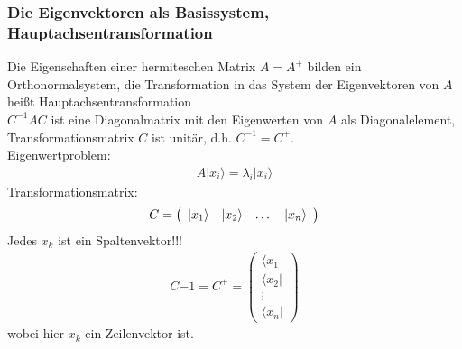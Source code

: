 \documentclass{article}
\begin{document}
\subsubsection{Die Eigenvektoren als Basissystem, Hauptachsentransformation}
Die Eigenschaften einer hermiteschen Matrix $A = A^+$ bilden ein Orthonormalsystem, die Transformation in das System der Eigenvektoren von $A$ heißt Hauptachsentransformation\\
$C^{-1}AC$ ist eine Diagonalmatrix mit den Eigenwerten von $A$ als Diagonalelement, Transformationsmatrix $C$ ist unitär, d.h. $C^{-1} = C^+$.\\
Eigenwertproblem:\begin{eqnarray*}
    A|x_i\rangle = \lambda_i|x_i\rangle
\end{eqnarray*}
Transformationsmatrix:\begin{eqnarray*}
    C=\left(\begin{array}{c c c c}
        |x_1\rangle&|x_2\rangle&\dots&|x_n\rangle
    \end{array}\right)
\end{eqnarray*}
Jedes $x_k$ ist ein Spaltenvektor!!!\\
\begin{eqnarray*}
    C{-1} = C^+ = \left(\begin{array}{c}
        \langle x_1\\
        \langle x_2|\\
        \vdots\\
        \langle x_n|
    \end{array}\right)
\end{eqnarray*}
wobei hier $x_k$ ein Zeilenvektor ist.\\
\end{document}
